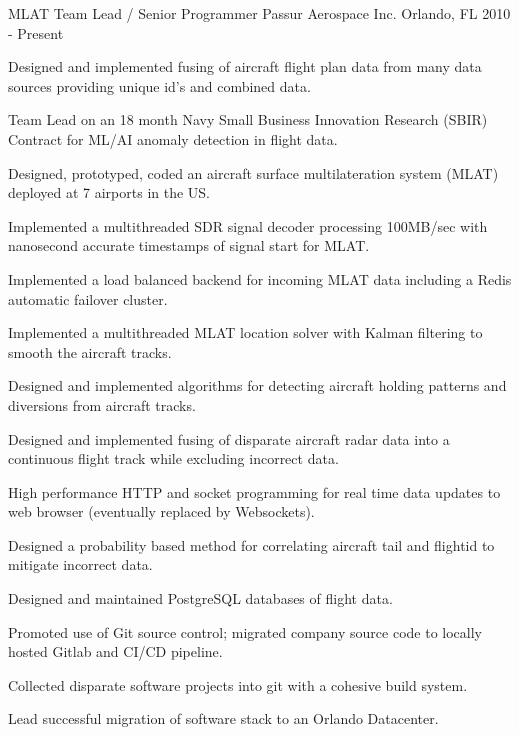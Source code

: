 

\begin{cventries}

  \cventry
    {MLAT Team Lead / Senior Programmer} %
    {Passur Aerospace Inc.} %
    {Orlando, FL} %
    {2010 - Present} %
    {
      \begin{cvitems} %
        \item {Designed and implemented fusing of aircraft flight plan data from many data sources providing unique id's and combined data.}
        \item {Team Lead on an 18 month Navy Small Business Innovation Research (SBIR) Contract for ML/AI anomaly detection in flight data.}
        \item {Designed, prototyped, coded an aircraft surface multilateration system (MLAT) deployed at 7 airports in the US.}
        \item {Implemented a multithreaded SDR signal decoder processing 100MB/sec with nanosecond accurate timestamps of signal start for MLAT.}
        \item {Implemented a load balanced backend for incoming MLAT data including a Redis automatic failover cluster.}
        \item {Implemented a multithreaded MLAT location solver with Kalman filtering to smooth the aircraft tracks.}
        \item {Designed and implemented algorithms for detecting aircraft holding patterns and diversions from aircraft tracks.}
        \item {Designed and implemented fusing of disparate aircraft radar data into a continuous flight track while excluding incorrect data.}
        \item {High performance HTTP and socket programming for real time data updates to web browser (eventually replaced by Websockets).}
        \item {Designed a probability based method for correlating aircraft tail and flightid to mitigate incorrect data.}
        \item {Designed and maintained PostgreSQL databases of flight data.}
        \item {Promoted use of Git source control; migrated company source code to locally hosted Gitlab and CI/CD pipeline.}
        \item {Collected disparate software projects into git with a cohesive build system.}
        \item {Lead successful migration of software stack to an Orlando Datacenter.}
      \end{cvitems}
    }


\end{cventries}
